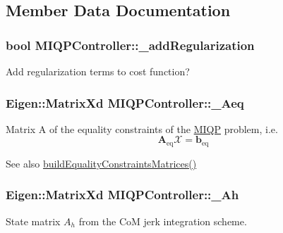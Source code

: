 \subsection{\-Member \-Data \-Documentation}
\hypertarget{classMIQPController_ad64b7131a2a61bf8d3b18aec6ddd677a}{
\subsubsection[{\-\_\-add\-Regularization}]{\setlength{\rightskip}{0pt plus 5cm}bool {\bf \-M\-I\-Q\-P\-Controller\-::\-\_\-add\-Regularization}}}\label{classMIQPController_ad64b7131a2a61bf8d3b18aec6ddd677a}
\-Add regularization terms to cost function? \hypertarget{classMIQPController_abc22f1db5a2dbcab4006c1b903a19c4e}{
\subsubsection[{\-\_\-\-Aeq}]{\setlength{\rightskip}{0pt plus 5cm}\-Eigen\-::\-Matrix\-Xd {\bf \-M\-I\-Q\-P\-Controller\-::\-\_\-\-Aeq}}}\label{classMIQPController_abc22f1db5a2dbcab4006c1b903a19c4e}
\-Matrix \-A of the equality constraints of the \hyperlink{namespaceMIQP}{\-M\-I\-Q\-P} problem, i.\-e. \[ \mathbf{A}_{\text{eq}} \mathbf{\mathcal{X}} = \mathbf{b}_{\text{eq}} \]

\begin{DoxySeeAlso}{\-See also}
\hyperlink{classMIQPController_a870c7d3c0e5fcfd46f7bb95924007082}{build\-Equality\-Constraints\-Matrices()} 
\end{DoxySeeAlso}
\hypertarget{classMIQPController_a388ed1c232c212e171276993b5cb3fec}{
\subsubsection[{\-\_\-\-Ah}]{\setlength{\rightskip}{0pt plus 5cm}\-Eigen\-::\-Matrix\-Xd {\bf \-M\-I\-Q\-P\-Controller\-::\-\_\-\-Ah}}}\label{classMIQPController_a388ed1c232c212e171276993b5cb3fec}
\-State matrix $A_h$ from the \-Co\-M jerk integration scheme.

